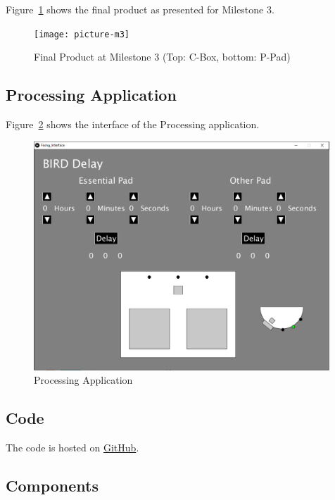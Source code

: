 \documentclass[10pt, oneside, letterpaper, titlepage]{article}
\begin{document}
			\clearpage
			Figure~\ref{fig:picture-m3} shows the final product as presented for Milestone 3.

			\begin{figure}[!htb]
				\centering
				\texttt{[image: picture-m3]}
				\caption{Final Product at Milestone 3 (Top: C-Box, bottom: P-Pad)}
				\label{fig:picture-m3}
			\end{figure}

			

		\subsection{Processing Application}

			Figure~\ref{fig:processing-application} shows the interface of the Processing application.

			\begin{figure}[!htb]
				\centering
				\includegraphics[width=30em]{processing-application}
				\caption{Processing Application}
				\label{fig:processing-application}
			\end{figure}

		\subsection{Code}
			The code is hosted on \href{https://github.com/jleung51/BIRD}{GitHub}.

		\subsection{Components}
\end{document}
